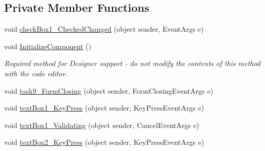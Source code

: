 \subsection*{Private Member Functions}
\begin{DoxyCompactItemize}
\item 
void \hyperlink{class__7___doroshenko__forms2__is52_1_1_task__9_a0ff0bb8624f4a84309bfdfd506377c16}{check\+Box1\+\_\+\+Checked\+Changed} (object sender, Event\+Args e)
\item 
void \hyperlink{class__7___doroshenko__forms2__is52_1_1_task__9_aa49b500c1ab2cab10eb0e298c86bd3f7}{Initialize\+Component} ()
\begin{DoxyCompactList}\small\item\em Required method for Designer support -\/ do not modify the contents of this method with the code editor. \end{DoxyCompactList}\item 
void \hyperlink{class__7___doroshenko__forms2__is52_1_1_task__9_af51986ccc846ac91671650739e1764a3}{task9\+\_\+\+Form\+Closing} (object sender, Form\+Closing\+Event\+Args e)
\item 
void \hyperlink{class__7___doroshenko__forms2__is52_1_1_task__9_aa5d0880b9c625e091b43b6aa410658ae}{text\+Box1\+\_\+\+Key\+Press} (object sender, Key\+Press\+Event\+Args e)
\item 
void \hyperlink{class__7___doroshenko__forms2__is52_1_1_task__9_afb796d1d759b3394c04953f05fea6a2d}{text\+Box1\+\_\+\+Validating} (object sender, Cancel\+Event\+Args e)
\item 
void \hyperlink{class__7___doroshenko__forms2__is52_1_1_task__9_a2e680b59861c94a70411eeb3082e2f49}{text\+Box2\+\_\+\+Key\+Press} (object sender, Key\+Press\+Event\+Args e)
\end{DoxyCompactItemize}

